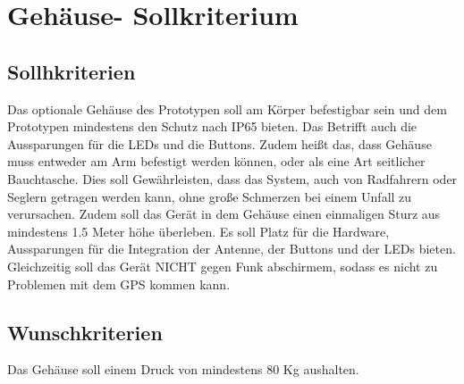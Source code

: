 \documentclass[a4paper]{scrreprt}
\begin{document}
\section{Gehäuse- Sollkriterium}
\subsection{Sollhkriterien}
Das optionale Gehäuse des Prototypen soll am Körper befestigbar sein und dem Prototypen mindestens den Schutz nach IP65 bieten. Das Betrifft auch die Aussparungen für die LEDs und die Buttons. Zudem heißt das, dass Gehäuse muss entweder am Arm befestigt werden können, oder als eine Art seitlicher Bauchtasche. Dies soll Gewährleisten, dass das System, auch von Radfahrern oder Seglern getragen werden kann, ohne große Schmerzen bei einem Unfall zu verursachen.  Zudem soll das Gerät in dem Gehäuse einen einmaligen Sturz aus mindestens 1.5 Meter höhe überleben. Es soll Platz für die Hardware, Aussparungen für die Integration der Antenne, der Buttons und der LEDs bieten. Gleichzeitig soll das Gerät NICHT gegen Funk abschirmem, sodass es nicht zu Problemen mit dem GPS kommen kann.
\subsection{Wunschkriterien}
Das Gehäuse soll einem Druck von mindestens 80 Kg aushalten.
 
\end{document}
